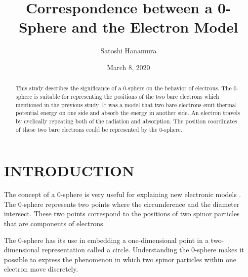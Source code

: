 \documentclass[
 reprint,
 amsmath,amssymb,
 aps,
]{revtex4-1}
\numberwithin{equation}{section}%
\begin{document}


    \title{Correspondence between a 0-Sphere and the Electron Model}
        \author{Satoshi Hanamura}
        \date{March 8, 2020}
        \begin{abstract}
            This study describes the significance of a 0-sphere on the behavior of electrons. The 0-sphere is suitable for representing the positions of the two bare electrons which mentioned in the previous study. It was a model that two bare electrons emit thermal potential energy on one side and absorb the energy in another side. An electron travels by cyclically repeating both of the radiation and absorption. The position coordinates of these two bare electrons could be represented by the 0-sphere.
            
        \end{abstract}
    \maketitle


\section{\label{sec:INTRODUCTION}INTRODUCTION}

    The concept of a 0-sphere is very useful for explaining new electronic models \cite{Hanamura}. The 0-sphere represents two points where the circumference and the diameter intersect. These two points correspond to the positions of two spinor particles that are components of electrons.

    The 0-sphere has its use in embedding a one-dimensional point in a two-dimensional representation called a circle. Understanding the 0-sphere makes it possible to express the phenomenon in which two spinor particles within one electron move discretely.

\end{document}

